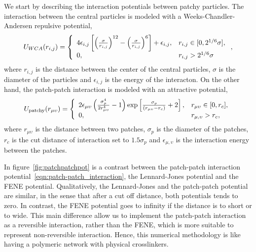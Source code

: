 We start by describing the interaction potentials between patchy particles.
The interaction between the central particles is modeled with a Weeks-Chandler-Andersen repulsive potential,
\begin{gather}
    U_{WCA}(r_{i,j}) =\left\{ 
        \begin{array}{ll}
            4\epsilon_{i,j}\left[\qty(\frac{\sigma}{r_{i,j}})^{12}-\qty(\frac{\sigma}{r_{i,j}})^6\right]+\epsilon_{i,j}, & r_{i,j}\in[0,2^{1/6}\sigma], \\
            0, & r_{i,j}>2^{1/6}\sigma
        \end{array}
\right.
    ,\label{eqn:CL-MO_interaction}
\end{gather}
where $r_{i,j}$ is the distance between the center of the central particles, $\sigma$ is the diameter of the particles and $\epsilon_{i,j}$ is the energy of the interacton.
On the other hand, the patch-patch interaction is modeled with an attractive potential,
\begin{gather}
    U_{\mathrm{patchy}}\qty(r_{\mu\upsilon}) = \left\{
        \begin{array}{ll}
            2\epsilon_{\mu\upsilon}\left(\frac{\sigma_p^4}{2 r_{\mu\upsilon}^4}-1\right)\exp\left[\frac{\sigma_p}{\qty(r_{\mu\upsilon}-r_{c})}+2\right], & r_{\mu\upsilon}\in\qty[0,r_c], \\
            0, & r_{\mu,\upsilon}>r_c,
        \end{array}
            \right.\label{eqn:patch-patch_interaction}
\end{gather}
where $r_{\mu\upsilon}$ is the distance between two patches, $\sigma_p$ is the diameter of the patches, $r_c$ is the cut distance of interaction set to $1.5\sigma_p$ and $\epsilon_{\mu,\upsilon}$ is the interaction energy between the patches.

In figure~\ref{fig:patchpatchpot} is a contrast between the patch-patch interaction potential~\eqref{eqn:patch-patch_interaction}, the Lennard-Jones potential and the FENE potential.
Qualitatively, the Lennard-Jones and the patch-patch potential are similar, in the sense that after a cut off distance, both potentials tends to zero.
In contrast, the FENE potential goes to infinity if the distance is to short or to wide.
This main difference allow us to implement the patch-patch interaction as a reversible interaction, rather than the FENE, which is more suitable to represent non-reversible interaction.
Hence, this numerical methodology is like having a polymeric network with physical crosslinkers.

